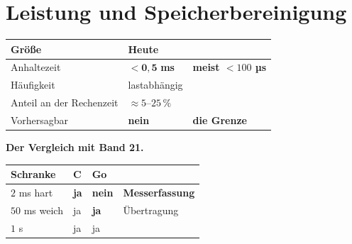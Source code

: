 \chapter{Leistung und Speicherbereinigung}\label{kap:leistung}

\begin{merksatz}
\begin{center}
\renewcommand{\arraystretch}{1.5}
\begin{tabular}{@{}P{3.0cm}P{2.2cm}P{2.8cm}@{}}
\toprule
\textbf{Größe} & \textbf{Heute} & \\
\midrule
Anhaltezeit & \textcolor{gruen}{$<\mathbf{0{,}5}$ \textbf{ms}} & \textbf{meist $<100$ µs}\\
Häufigkeit & lastabhängig & \\
Anteil an der Rechenzeit & $\approx5$--$25\,\%$ & \\
Vorhersagbar & \textcolor{akzent}{\textbf{nein}} & \textcolor{akzent}{\textbf{die Grenze}}\\
\bottomrule
\end{tabular}
\end{center}

\begin{center}
\begin{minipage}{0.88\textwidth}
\end{minipage}
\end{center}

\textbf{Der Vergleich mit Band 21.}

\begin{center}
\renewcommand{\arraystretch}{1.45}
\begin{tabular}{@{}P{2.4cm}P{1.6cm}P{1.8cm}P{2.8cm}@{}}
\toprule
\textbf{Schranke} & \textbf{C} & \textbf{Go} & \\
\midrule
$2$ ms hart & \textcolor{gruen}{\textbf{ja}} & \textcolor{akzent}{\textbf{nein}} & \textbf{Messerfassung}\\
$50$ ms weich & \textcolor{gruen}{ja} & \textcolor{gruen}{\textbf{ja}} & \textcolor{gruen}{Übertragung}\\
$1$ s & \textcolor{gruen}{ja} & \textcolor{gruen}{ja} & \\
\bottomrule
\end{tabular}
\end{center}


\end{merksatz}
